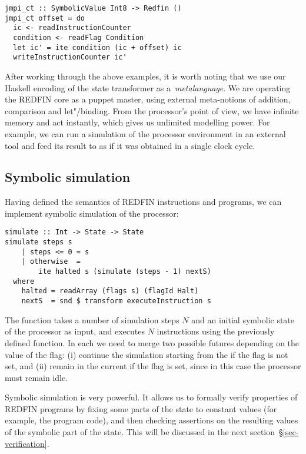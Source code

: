 \begin{verbatim}
jmpi_ct :: SymbolicValue Int8 -> Redfin ()
jmpi_ct offset = do
  ic <- readInstructionCounter
  condition <- readFlag Condition
  let ic' = ite condition (ic + offset) ic
  writeInstructionCounter ic'
\end{verbatim}


\noindent
After working through the above examples, it is worth noting that we use our
Haskell encoding of the state transformer as a~\emph{metalanguage}. We are
operating the REDFIN core as a puppet master, using external
meta-notions of addition,
comparison and let"/binding. From the processor's
point of view, we have infinite memory and act instantly, which gives us unlimited
modelling power. For example, we can run a simulation of the processor environment
in an external tool and feed its result to  as if it was
obtained in a single clock cycle.

\subsection{Symbolic simulation}

Having defined the semantics of REDFIN instructions and programs, we can
implement symbolic simulation of the processor:

\begin{verbatim}
simulate :: Int -> State -> State
simulate steps s
    | steps <= 0 = s
    | otherwise  =
        ite halted s (simulate (steps - 1) nextS)
  where
    halted = readArray (flags s) (flagId Halt)
    nextS  = snd $ transform executeInstruction s
\end{verbatim}

\noindent
The function takes a number of simulation steps $N$ and an initial symbolic
state of the processor as input, and executes $N$ instructions using the
previously defined  function. In each  we need
to merge two possible futures depending on the value of the  flag:
(i) continue the simulation starting from the  if the flag is not
set, and (ii) remain in the current  if the flag is set, since in
this case the processor must remain idle.

Symbolic simulation is very powerful. It allows us to formally verify properties
of REDFIN programs by fixing some parts of the state to constant values (for
example, the program code), and then checking assertions on the resulting values of
the symbolic part of the state. This will be discussed in the next
section~\S\ref{sec-verification}.

